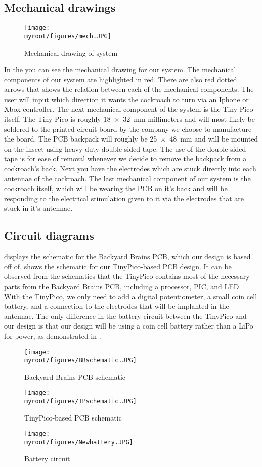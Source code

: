 \documentclass[twocolumn,10pt]{IEEEtran}
\newcommand{\myroot}{.}
\begin{document}
\subsection{Mechanical drawings}
\begin{figure}[ht!]
\centering
\texttt{[image: \\myroot/figures/mech.JPG]}
\caption{Mechanical drawing of system}
\label{fig:mech}
\end{figure}
In the  you can see the mechanical drawing for our system. The mechanical components of our system are highlighted in red. There are also red dotted arrows that shows the relation between each of the mechanical components. The user will input which direction it wants the cockroach to turn via an Iphone or Xbox controller. The next mechanical component of the system is the Tiny Pico itself. The Tiny Pico is roughly \SI{18x32}{\milli\meter} millimeters and will most likely be soldered to the printed circuit board by the company we choose to manufacture the board. The PCB backpack will roughly be \SI{25x48}{\milli\meter} and will be mounted on the insect using heavy duty double sided tape. The use of the double sided tape is for ease of removal whenever we decide to remove the backpack from a cockroach's back. Next you have the electrodes which are stuck directly into each antennae of the cockroach. The last mechanical component of our system is the cockroach itself, which will be wearing the PCB on it's back and will be responding to the electrical stimulation given to it via the electrodes that are stuck in it's antennae. 

\subsection{Circuit diagrams}
 displays the schematic for the Backyard Brains PCB, which our design is based off of.  shows the schematic for our TinyPico-based PCB design. It can be observed from the schematics that the TinyPico contains most of the necessary parts from the Backyard Brains PCB, including a processor, PIC, and LED. With the TinyPico, we only need to add a digital potentiometer, a small coin cell battery, and a connection to the electrodes that will be implanted in the antennae. The only difference in the battery circuit between the TinyPico and our design is that our design will be using a coin cell battery rather than a LiPo for power, as demonstrated in .
\begin{figure}[ht!]
\centering
\texttt{[image: \\myroot/figures/BBschematic.JPG]}
\caption{Backyard Brains PCB schematic}
\label{fig:bbs}
\end{figure}
\begin{figure}[ht!]
\centering
\texttt{[image: \\myroot/figures/TPschematic.JPG]}
\caption{TinyPico-based PCB schematic}
\label{fig:tps}
\end{figure}
\begin{figure}[ht!]
\centering
\texttt{[image: \\myroot/figures/Newbattery.JPG]}
\caption{Battery circuit}
\label{fig:newbatt}
\end{figure}
\end{document}
